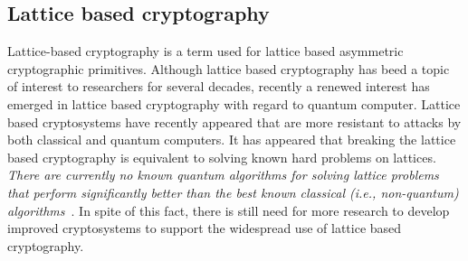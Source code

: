 \subsection*{Lattice based cryptography}
Lattice-based cryptography is a term used for lattice based asymmetric cryptographic primitives. Although lattice based cryptography has beed a topic of interest to researchers for several decades, recently a renewed interest has emerged in lattice based cryptography with regard to quantum computer. Lattice based cryptosystems have recently appeared that are more resistant to attacks by both classical and quantum computers. It has appeared that breaking the lattice based cryptography is equivalent to solving known hard problems on lattices. \emph{There are currently no known quantum algorithms for solving lattice problems that perform significantly better than the best known classical (i.e., non-quantum) algorithms}~\cite{Ludwig2011}. In spite of this fact, there is still need for more research to develop improved cryptosystems to support the widespread use of lattice based cryptography.


























